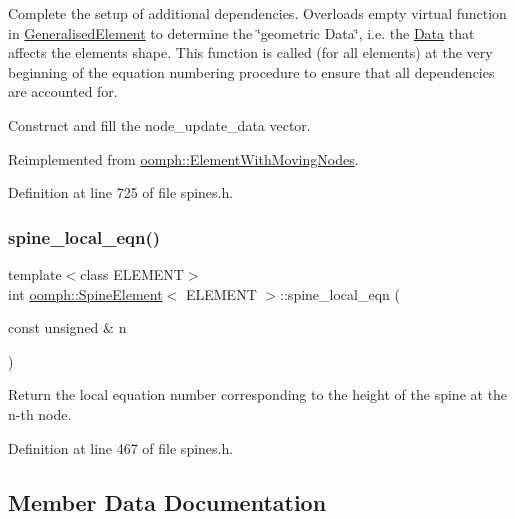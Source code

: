 Complete the setup of additional dependencies. Overloads empty virtual function in \hyperlink{classoomph_1_1GeneralisedElement}{Generalised\+Element} to determine the \char`\"{}geometric 
\+Data\char`\"{}, i.\+e. the \hyperlink{classoomph_1_1Data}{Data} that affects the element\textquotesingle{}s shape. This function is called (for all elements) at the very beginning of the equation numbering procedure to ensure that all dependencies are accounted for. 

Construct and fill the node\+\_\+update\+\_\+data vector. 

Reimplemented from \hyperlink{classoomph_1_1ElementWithMovingNodes_a6d2fa178f36d4b8413a9ce4f24e9c87e}{oomph\+::\+Element\+With\+Moving\+Nodes}.



Definition at line 725 of file spines.\+h.

\mbox{\label{classoomph_1_1SpineElement_aaee520873e49100368ac2362e3d16324}} 
\subsubsection{\texorpdfstring{spine\+\_\+local\+\_\+eqn()}{spine\_local\_eqn()}}
{\footnotesize\ttfamily template$<$class E\+L\+E\+M\+E\+NT$>$ \\
int \hyperlink{classoomph_1_1SpineElement}{oomph\+::\+Spine\+Element}$<$ E\+L\+E\+M\+E\+NT $>$\+::spine\+\_\+local\+\_\+eqn (\begin{DoxyParamCaption}\item[{const unsigned \&}]{n }\end{DoxyParamCaption})\hspace{0.3cm}{\ttfamily [inline]}}



Return the local equation number corresponding to the height of the spine at the n-\/th node. 



Definition at line 467 of file spines.\+h.



\subsection{Member Data Documentation}
\mbox{\label{classoomph_1_1SpineElement_a222c05c78bc15766a81a8a05c811fcf6}} 
